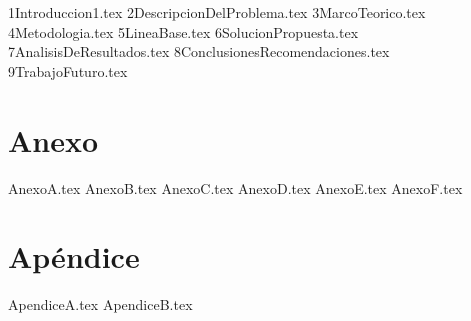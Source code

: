\documentclass[12pt,letterpaper,oneside]{book}
\newcommand{\capitulo}[1]{{#1.tex}}
\newcommand{\apendice}[1]{{#1.tex}}
\newcommand{\anexo}[1]{{#1.tex}}
\begin{document}
\frontmatter

\clearpage
\thispagestyle{empty}

\clearpage
\thispagestyle{empty}
\tableofcontents
\thispagestyle{empty}
\clearpage

\setcounter{page}{1}
\listoffigures
{}
\clearpage
\listoftables
{}
\clearpage

\mainmatter

\capitulo{1Introduccion1}
\capitulo{2DescripcionDelProblema}
\capitulo{3MarcoTeorico}
\capitulo{4Metodologia}
\capitulo{5LineaBase}
\capitulo{6SolucionPropuesta}
\capitulo{7AnalisisDeResultados}
\capitulo{8ConclusionesRecomendaciones}
\capitulo{9TrabajoFuturo}
\chapter*{Anexo}
\renewcommand{\thesection}{\Alph{section}}
\anexo{AnexoA}
\anexo{AnexoB}
\anexo{AnexoC}
\anexo{AnexoD}
\anexo{AnexoE}
\anexo{AnexoF}
\appendix
{}
\chapter*{Apéndice}
\apendice{ApendiceA}
\apendice{ApendiceB}
\backmatter


\end{document}
